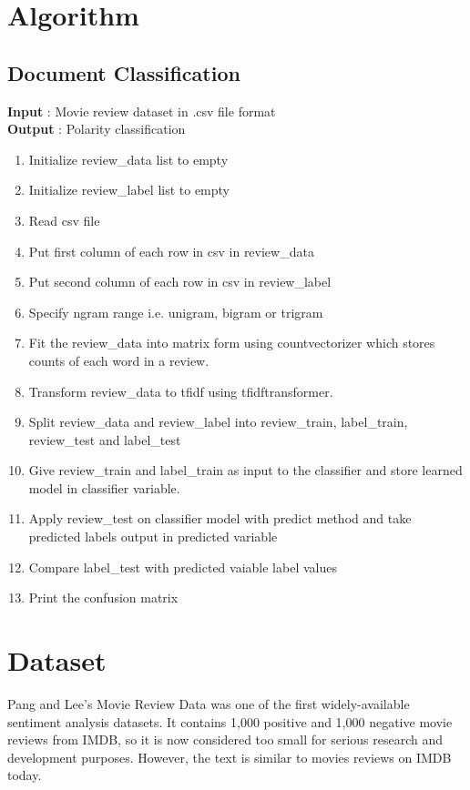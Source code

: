 \documentclass[oneside,a4paper,12pt]{pictreport}
\begin{document}
\section{Algorithm}
\subsection{Document Classification}

\textbf{Input} : Movie review dataset in .csv file format \\
\textbf{Output} : Polarity classification \\

\begin{enumerate}
\item Initialize review\_data list to empty
\item Initialize review\_label list to empty
\item Read csv file
\item Put first column of each row in csv in review\_data
\item Put second column of each row in csv in review\_label
\item Specify ngram range i.e. unigram, bigram or trigram
\item Fit the review\_data into matrix form using countvectorizer
which stores counts of each word in a review.
\item Transform review\_data to tfidf using tfidftransformer.
\item Split review\_data and review\_label into review\_train, 
label\_train, review\_test and label\_test
\item Give review\_train and label\_train as input to the classifier
and store learned model in classifier variable.
\item Apply review\_test on classifier model with predict method
and take predicted labels output in predicted variable
\item Compare label\_test with predicted vaiable label values
\item Print the confusion matrix
\end{enumerate}\section{Dataset}
\hspace{1.1cm} Pang and Lee's Movie Review Data was one of the first widely-available sentiment analysis datasets. It contains 1,000 positive and 1,000 negative movie reviews from IMDB, so it is now considered too small for serious research and development purposes. However, the text is similar to movies reviews on IMDB today.
\end{document}
